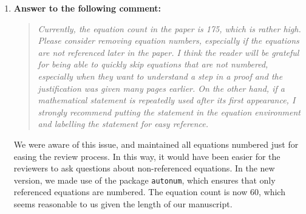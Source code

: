 \documentclass[10pt]{article}
\begin{document}
\begin{enumerate}
\item \textbf{Answer to the following comment:}
\begin{quote} \textit{Currently, the equation count in the paper is 175, which is rather high. Please consider removing equation numbers, especially if the equations are not referenced later in the paper. I think the reader will be grateful for being able to quickly skip equations that are not numbered, especially when they want to understand a step in a proof and the justification was given many pages earlier. On the other hand, if a mathematical statement is repeatedly used after its first appearance, I strongly recommend putting the statement in the equation environment and labelling the statement for easy reference.} \end{quote}
We were aware of this issue, and maintained all equations numbered just for easing the review process. In this way, it would have been easier for the reviewers to ask questions about non-referenced equations. In the new version, we made use of the package \texttt{autonum}, which ensures that only referenced equations are numbered. The equation count is now 60, which seems reasonable to us given the length of our manuscript.


\end{enumerate}
\end{document}
